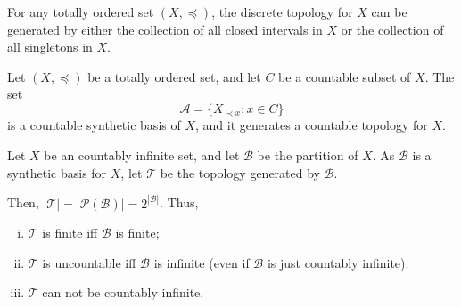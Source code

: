 \documentclass{report}
\begin{document}
\begin{example}
	For any totally ordered set $(X, \preceq)$, the discrete topology for $X$ can be generated by either the collection of all closed intervals in $X$ or the collection of all singletons in $X$.
\end{example}


\begin{example}
	Let $(X, \preceq)$ be a totally ordered set, and let $C$ be a countable subset of $X$. The set
	$$
	\mathcal A = \{ X_{\prec x} : x \in C \}
	$$
	is a countable synthetic basis of $X$, and it generates a countable topology for $X$.
\end{example}


\begin{example}
	Let $X$ be an countably infinite set, and let $\mathcal B$ be the partition of $X$. As $\mathcal B$ is a synthetic basis for $X$, let $\mathcal T$ be the topology generated by $\mathcal B$.
	
	Then, $|\mathcal T| = |\mathcal P(\mathcal B)| = 2^{|\mathcal B|}$. Thus,
	\begin{enumerate}[(i)]
		\item $\mathcal T$ is finite iff $\mathcal B$ is finite;
		\item $\mathcal T$ is uncountable iff $\mathcal B$ is infinite (even if $\mathcal B$ is just countably infinite).
		\item $\mathcal T$ can not be countably infinite.
	\end{enumerate}
\end{example}



































\end{document}
